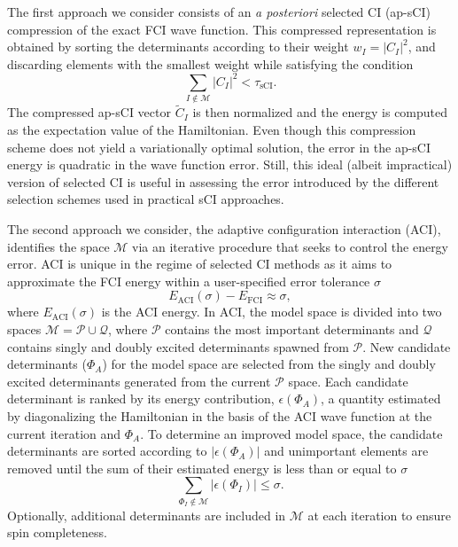 \documentclass[aip,jcp,amsmath,amssymb, preprint]{revtex4-1}
\begin{document}
The first approach we consider consists of an \textit{a posteriori} selected CI (ap-sCI) compression of the exact FCI wave function.
This compressed representation is obtained by sorting the determinants according to their weight $w_I = |C_I|^2$, and discarding elements with the smallest weight while satisfying the condition
\begin{equation}
\sum_{I \notin \mathcal{M}} |C_I|^{2} < \tau_{\text{sCI}}.
\end{equation}
The compressed ap-sCI vector $\tilde{C}_I$ is then normalized and the energy is computed as the expectation value of the Hamiltonian.
Even though this compression scheme does not yield a variationally optimal solution, the error in the ap-sCI energy is quadratic in the wave function error.
Still, this ideal (albeit impractical) version of selected CI is useful in assessing the error introduced by the different selection schemes used in practical sCI approaches.

The second approach we consider, the adaptive configuration interaction (ACI),\cite{Schriber2016Adaptive, Schriber2017Adaptive} identifies the space $\mathcal{M}$ via an iterative procedure that seeks to control the energy error.
ACI is unique in the regime of selected CI methods as it aims to approximate the FCI energy within a user-specified error tolerance $\sigma$
\begin{equation}
E_{\text{ACI}}(\sigma) - E_{\text{FCI}} \approx \sigma,
\end{equation}
where $E_{\text{ACI}}(\sigma)$ is the ACI energy.
In ACI, the model space is divided into two spaces $\mathcal{M} = \mathcal{P} \cup \mathcal{Q}$, where $\mathcal{P}$ contains the most important determinants and $\mathcal{Q}$ contains singly and doubly excited determinants spawned from $\mathcal{P}$.
New candidate determinants ($\Phi_{A}$) for the model space are selected from the singly and doubly excited determinants generated from the current $\mathcal{P}$ space. Each candidate determinant is ranked by its energy contribution, $\epsilon(\Phi_{A})$, a quantity estimated by diagonalizing the Hamiltonian in the basis of the ACI wave function at the current iteration and $\Phi_{A}$.
To determine an improved model space, the candidate determinants are sorted according to $|\epsilon(\Phi_{A})|$ and unimportant elements are removed until the sum of their estimated energy is less than or equal to $\sigma$
\begin{equation}
\label{eq:aci_selection}
\sum_{\Phi_{I} \notin \mathcal{M}} | \epsilon(\Phi_{I}) | \leq \sigma.
\end{equation}
Optionally, additional determinants are included in $\mathcal{M}$ at each iteration to ensure spin completeness.
\end{document}

